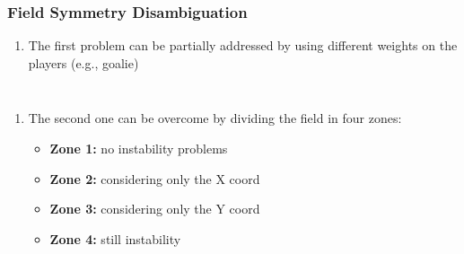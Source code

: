 \begin{frame}
	\frametitle{Field Symmetry Disambiguation}
	
	\Large
	
	\vspace{0.08cm}
	
	\begin{enumerate}
		\item The first problem can be partially addressed by using different weights on the
			  players (e.g., goalie)
		
		\seti
	\end{enumerate}
	
	\begin{columns}[T]
		
		\begin{enumerate}
			\vspace{-0.4cm}
			\conti
			\item The second one can be overcome by dividing the field in four zones:
				  
				  \begin{itemize}
				  	  \item \textbf{Zone 1:} no instability problems
				  	  \vspace{0.15cm}
				  	  \item \textbf{Zone 2:} considering only the X coord
				  	  \vspace{0.15cm}
				  	  \item \textbf{Zone 3:} considering only the Y coord
				  	  \vspace{0.15cm}
				  	  \item \textbf{Zone 4:} still instability
				  \end{itemize}
		\end{enumerate}
		
		\centering
		
		\vspace{0.25cm}
		
	\end{columns}
\end{frame}

